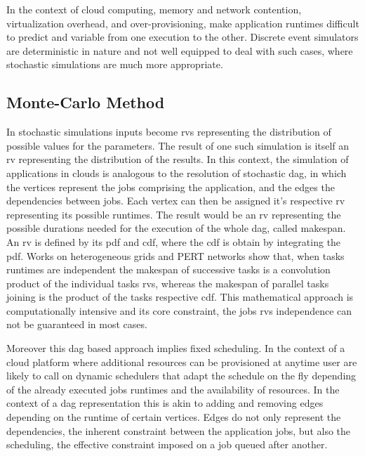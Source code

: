 \documentclass[10pt,conference,compsocconf]{IEEEtran}
\begin{document}
In the context  of cloud computing, memory and network contention, virtualization
overhead, and over-provisioning, make application runtimes difficult to predict
and variable from one execution to the other. Discrete event simulators are
deterministic in nature and not well equipped to deal with such cases, where
stochastic simulations are much more appropriate.


\subsection{Monte-Carlo Method}

In stochastic simulations inputs become \acfp{rv} representing the distribution
of possible values for the parameters. The result of one such simulation is
itself an \ac{rv} representing the distribution of the results. In this context, the
simulation of applications in clouds is analogous to the resolution of
stochastic \ac{dag}, in which the vertices represent the jobs comprising the
application, and the edges the dependencies between jobs. Each vertex can then
be assigned it's respective \ac{rv} representing its possible runtimes. The
result would be an \ac{rv} representing the possible durations needed for the
execution of the whole \ac{dag}, called makespan. An \ac{rv} is defined by its
\ac{pdf} and \ac{cdf}, where the \ac{cdf} is obtain by integrating the \ac{pdf}.
Works on heterogeneous grids\cite{Li97} and PERT networks\cite{Ludwig01} show
that, when tasks runtimes are independent the makespan of successive tasks is a
convolution product of the individual tasks \acp{rv}, whereas the makespan of
parallel tasks joining is the product of the tasks respective \ac{cdf}. This
mathematical approach is computationally intensive and its core constraint, the
jobs \acp{rv} independence can not be guaranteed in most cases. 

Moreover this \ac{dag} based approach implies fixed scheduling. In the context
of a cloud platform where additional resources can be provisioned at anytime
user are likely to call on dynamic schedulers that adapt the schedule on the fly
depending of the already executed jobs runtimes and the availability of
resources. In the context of a \ac{dag} representation this is akin to adding
and removing edges depending on the runtime of certain vertices. Edges do not
only represent the dependencies, the inherent constraint between the application
jobs, but also the scheduling, the effective constraint imposed on a job queued
after another.
\end{document}
